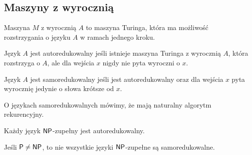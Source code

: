 \subsection{Maszyny z wyrocznią}

Maszyna $M$ z wyrocznią $A$ to maszyna Turinga, która ma możliwość rozstrzygania o języku $A$ w ramach jednego kroku.

\begin{definition}[autoredukcja]
    Język $A$ jest autoredukowalny jeśli istnieje maszyna Turinga z wyrocznią $A$, która rozstrzyga o $A$, ale dla wejścia $x$ nigdy nie pyta wyroczni o $x$.
\end{definition}

\begin{definition}[samoredukcja]
    Język $A$ jest samoredukowalny jeśli jest autoredukowalny oraz dla wejścia $x$ pyta wyrocznię jedynie o słowa krótsze od $x$.
\end{definition}

O językach samoredukowalnych mówimy, że mają naturalny algorytm rekurencyjny.

\begin{theorem}
    Każdy język $\textsf{NP}$-zupełny jest autoredukowalny.
\end{theorem}

\begin{theorem}
    Jeśli $\textsf{P} \neq \textsf{NP}$, to nie wszystkie języki $\textsf{NP}$-zupełne są samoredukowalne.
\end{theorem}